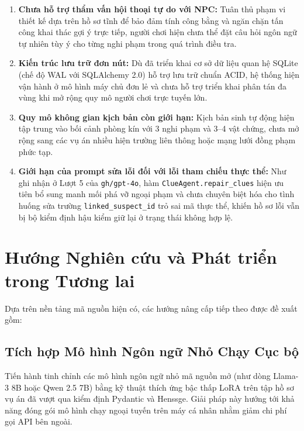 \begin{enumerate}[leftmargin=1.5cm]
    \item \textbf{Chưa hỗ trợ thẩm vấn hội thoại tự do với NPC:} Tuân thủ phạm vi thiết kế dựa trên hồ sơ tĩnh để bảo đảm tính công bằng và ngăn chặn tấn công khai thác gợi ý trực tiếp, người chơi hiện chưa thể đặt câu hỏi ngôn ngữ tự nhiên tùy ý cho từng nghi phạm trong quá trình điều tra.
    
    \item \textbf{Kiến trúc lưu trữ đơn nút:} Dù đã triển khai cơ sở dữ liệu quan hệ SQLite (chế độ WAL với SQLAlchemy 2.0) hỗ trợ lưu trữ chuẩn ACID, hệ thống hiện vận hành ở mô hình máy chủ đơn lẻ và chưa hỗ trợ triển khai phân tán đa vùng khi mở rộng quy mô người chơi trực tuyến lớn.
    
    \item \textbf{Quy mô không gian kịch bản còn giới hạn:} Kịch bản sinh tự động hiện tập trung vào bối cảnh phòng kín với 3 nghi phạm và 3--4 vật chứng, chưa mở rộng sang các vụ án nhiều hiện trường liên thông hoặc mạng lưới đồng phạm phức tạp.
    
    \item \textbf{Giới hạn của prompt sửa lỗi đối với lỗi tham chiếu thực thể:} Như ghi nhận ở Lượt 5 của \texttt{gh/gpt-4o}, hàm \texttt{ClueAgent.repair\_clues} hiện ưu tiên bổ sung manh mối phá vỡ ngoại phạm và chưa chuyên biệt hóa cho tình huống sửa trường \texttt{linked\_suspect\_id} trỏ sai mã thực thể, khiến hồ sơ lỗi vẫn bị bộ kiểm định hậu kiểm giữ lại ở trạng thái không hợp lệ.
\end{enumerate}

\section{Hướng Nghiên cứu và Phát triển trong Tương lai}
\label{sec:conclusion_future_work}

Dựa trên nền tảng mã nguồn hiện có, các hướng nâng cấp tiếp theo được đề xuất gồm:

\subsection{Tích hợp Mô hình Ngôn ngữ Nhỏ Chạy Cục bộ}
Tiến hành tinh chỉnh các mô hình ngôn ngữ nhỏ mã nguồn mở (như dòng Llama-3 8B hoặc Qwen 2.5 7B) bằng kỹ thuật thích ứng bậc thấp LoRA trên tập hồ sơ vụ án đã vượt qua kiểm định Pydantic và Henssge. Giải pháp này hướng tới khả năng đóng gói mô hình chạy ngoại tuyến trên máy cá nhân nhằm giảm chi phí gọi API bên ngoài.

